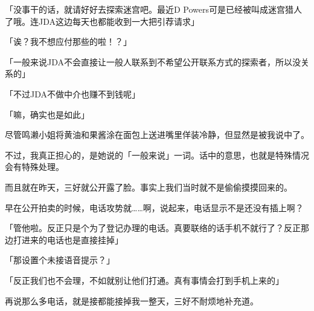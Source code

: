 「没事干的话，就请好好去探索迷宫吧。最近D Powers可是已经被叫成迷宫猎人了哦。连JDA这边每天也都能收到一大把引荐请求」

「诶？我不想应付那些的啦！？」

「一般来说JDA不会直接让一般人联系到不希望公开联系方式的探索者，所以没关系的」

「不过JDA不做中介也赚不到钱呢」

「嘛，确实也是如此」

尽管鸣濑小姐将黄油和果酱涂在面包上送进嘴里佯装冷静，但显然是被我说中了。

不过，我真正担心的，是她说的「一般来说」一词。话中的意思，也就是特殊情况会有特殊处理。

而且就在昨天，三好就公开露了脸。事实上我们当时就不是偷偷摸摸回来的。

早在公开拍卖的时候，电话攻势就……啊，说起来，电话显示不是还没有插上啊？

「管他啦。反正只是个为了登记办理的电话。真要联络的话手机不就行了？反正那边打进来的电话也是直接挂掉」

「那设置个未接语音提示？」

「反正我们也不会理，不如就别让他们打通。真有事情会打到手机上来的」

再说那么多电话，就是接都能接掉我一整天，三好不耐烦地补充道。

